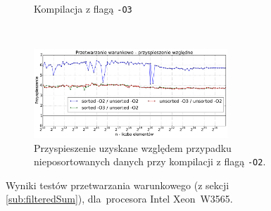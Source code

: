 \begin{figure}[!h]
\begin{subfigure}[c]{0.45\textwidth}
        \caption{Kompilacja z flagą \texttt{-O3}}
    \end{subfigure}
    \\
    \vspace{0.55cm}
    \begin{subfigure}[c]{1.0\textwidth}
        \centering
        \includegraphics[width=0.80\textwidth]{images/benchs_xeon/filtered_sum_normalized}
        \caption{Przyspieszenie uzyskane względem przypadku nieposortowanych danych przy kompilacji z flagą \texttt{-O2}.}
        \label{fig:filteredSumRelativeXeon}
    \end{subfigure}
    \caption{Wyniki testów przetwarzania warunkowego (z sekcji \ref{sub:filteredSum}), dla~procesora Intel \mbox{Xeon W3565}.}
    \label{fig:filteredSumXeon}
\end{figure}


